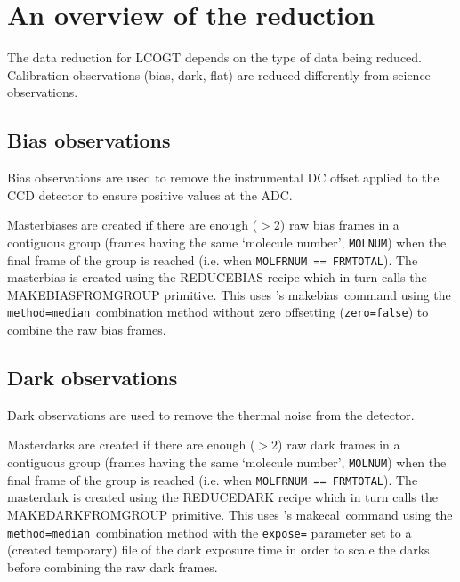 \documentclass[twoside,11pt]{article}
\newcommand{\xref}[3]{#1}
\renewcommand{\_}{\texttt{\symbol{95}}}
\newcommand{\CCDPACK}{\xref{{\sc{Ccdpack}}}{sun139}{}}
\newcommand{\ORACDR}{{\footnotesize ORAC-DR}}
\newcommand{\task}[1]{\textsf{#1}}
\newcommand{\makebias}{\xref{\task{makebias}}{sun139}{MAKEBIAS}}
\newcommand{\makecal}{\xref{\task{makecal}}{sun139}{MAKECAL}}
\newcommand{\aparam}[1]{\texttt{#1}}     %
\begin{document}



\section{An overview of the reduction}

The data reduction for LCOGT depends on the type of data being
reduced. Calibration observations (bias, dark, flat) are
reduced differently from science observations. 

\subsection{Bias observations}

Bias observations are used to remove the instrumental DC offset applied to the
CCD detector to ensure positive values at the ADC.

Masterbiases are created if there are enough ($>2$) raw bias frames in a
contiguous group (frames having the same `molecule number', \texttt{MOLNUM}) when
the final frame of the group is reached (i.e. when  \texttt{MOLFRNUM == 
FRMTOTAL}). The masterbias is created using the \task{REDUCE\_BIAS} recipe which
in turn calls the \task{\_MAKE\_BIAS\_FROM\_GROUP\_} primitive. This uses \CCDPACK's \makebias\ command using
the \aparam{method=median}\ combination method without zero offsetting
(\aparam{zero=false}) to combine the raw bias frames.

\subsection{Dark observations}

Dark observations are used to remove the thermal noise from the detector.

Masterdarks are created if there are enough ($>2$) raw dark frames in a
contiguous group (frames having the same `molecule number', \texttt{MOLNUM}) when
the final frame of the group is reached (i.e. when  \texttt{MOLFRNUM == 
FRMTOTAL}). The masterdark is created using the \task{REDUCE\_DARK} recipe which
in turn calls the \task{\_MAKE\_DARK\_FROM\_GROUP\_} primitive. This uses
\CCDPACK's \makecal\ command using the \aparam{method=median}\ combination
method with the \aparam{expose=} parameter set to a (created temporary) file of
the dark exposure time in order to scale the darks before combining the raw dark
frames.
\end{document}
